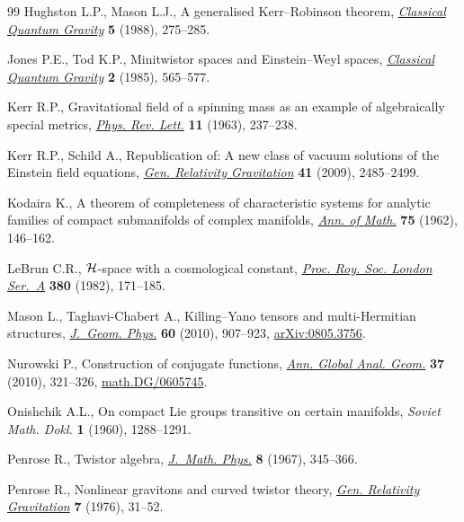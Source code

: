 \begin{thebibliography}{99}
Hughston L.P., Mason L.J., A generalised {K}err--{R}obinson theorem,
 \href{http://dx.doi.org/10.1088/0264-9381/5/2/007}{\textit{Classical Quantum Gravity}} \textbf{5} (1988), 275--285.

Jones P.E., Tod K.P., Minitwistor spaces and {E}instein--{W}eyl spaces,
 \href{http://dx.doi.org/10.1088/0264-9381/2/4/021}{\textit{Classical Quantum Gravity}} \textbf{2} (1985), 565--577.

Kerr R.P., Gravitational f\/ield of a spinning mass as an example of
 algebraically special metrics, \href{http://dx.doi.org/10.1103/PhysRevLett.11.237}{\textit{Phys. Rev. Lett.}} \textbf{11} (1963),
 237--238.

Kerr R.P., Schild A., Republication of: {A} new class of vacuum solutions of
 the {E}instein f\/ield equations, \href{http://dx.doi.org/10.1007/s10714-009-0857-z}{\textit{Gen. Relativity Gravitation}}
 \textbf{41} (2009), 2485--2499.

Kodaira K., A theorem of completeness of characteristic systems for analytic
 families of compact submanifolds of complex manifolds, \href{http://dx.doi.org/10.2307/1970424}{\textit{Ann. of Math.}}
 \textbf{75} (1962), 146--162.

LeBrun C.R., {${\cal H}$}-space with a cosmological constant, \href{http://dx.doi.org/10.1098/rspa.1982.0035}{\textit{Proc.
 Roy. Soc. London Ser.~A}} \textbf{380} (1982), 171--185.

Mason L., Taghavi-Chabert A., Killing--{Y}ano tensors and multi-{H}ermitian
 structures, \href{http://dx.doi.org/10.1016/j.geomphys.2010.02.008}{\textit{J.~Geom. Phys.}} \textbf{60} (2010), 907--923,
 \href{http://arxiv.org/abs/0805.3756}{arXiv:0805.3756}.

Nurowski P., Construction of conjugate functions, \href{http://dx.doi.org/10.1007/s10455-009-9186-4}{\textit{Ann. Global Anal.
 Geom.}} \textbf{37} (2010), 321--326, \href{http://arxiv.org/abs/math.DG/0605745}{math.DG/0605745}.

Onishchik A.L., On compact {L}ie groups transitive on certain manifolds,
 \textit{Soviet Math. Dokl.} \textbf{1} (1960), 1288--1291.

Penrose R., Twistor algebra, \href{http://dx.doi.org/10.1063/1.1705200}{\textit{J.~Math. Phys.}} \textbf{8} (1967),
 345--366.

Penrose R., Nonlinear gravitons and curved twistor theory, \href{http://dx.doi.org/10.1007/BF00762011}{\textit{Gen.
 Relativity Gravitation}} \textbf{7} (1976), 31--52.


\end{thebibliography}
